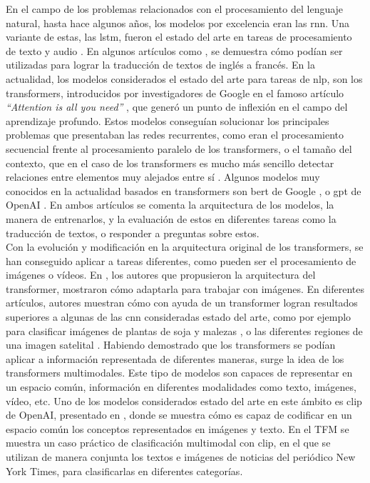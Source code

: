 	En el campo de los problemas relacionados con el procesamiento del lenguaje natural, hasta hace algunos años, los modelos por excelencia eran las \gls{rnn}. Una variante de estas, las \gls{lstm}, fueron el estado del arte en tareas de procesamiento de texto y audio \cite{ea_lstm}. En algunos artículos como \cite{ea_seq}, se demuestra cómo podían ser utilizadas para lograr la traducción de textos de inglés a francés. En la actualidad, los modelos considerados el estado del arte para tareas de \gls{nlp}, son los transformers, introducidos por investigadores de Google en el famoso artículo \textit{``Attention is all you need''} \cite{attention}, que generó un punto de inflexión en el campo del aprendizaje profundo. Estos modelos conseguían solucionar los principales problemas que presentaban las redes recurrentes, como eran el procesamiento secuencial frente al procesamiento paralelo de los transformers, o el tamaño del contexto, que en el caso de los transformers es mucho más sencillo detectar relaciones entre elementos muy alejados entre sí \cite{ea_rnn_transf}. Algunos modelos muy conocidos en la actualidad basados en transformers son \gls{bert} de Google \cite{ea_bert}, o \gls{gpt} de OpenAI \cite{ea_gpt}. En ambos artículos se comenta la arquitectura de los modelos, la manera de entrenarlos, y la evaluación de estos en diferentes tareas como la traducción de textos, o responder a preguntas sobre estos.\\ 
	
	Con la evolución y modificación en la arquitectura original de los transformers, se han conseguido aplicar a tareas diferentes, como pueden ser el procesamiento de imágenes o vídeos. En \cite{vit}, los autores que propusieron la arquitectura del transformer, mostraron cómo adaptarla para trabajar con imágenes. En diferentes artículos, autores muestran cómo con ayuda de un transformer logran resultados superiores a algunas de las \gls{cnn} consideradas estado del arte, como por ejemplo para clasificar imágenes de plantas de soja y malezas \cite{ea_vit}, o las diferentes regiones de una imagen satelital \cite{ea_vit2}. Habiendo demostrado que los transformers se podían aplicar a información representada de diferentes maneras, surge la idea de los transformers multimodales. Este tipo de modelos son capaces de representar en un espacio común, información en diferentes modalidades como texto, imágenes, vídeo, etc. Uno de los modelos considerados estado del arte en este ámbito es \gls{clip} de OpenAI, presentado en \cite{clip}, donde se muestra cómo es capaz de codificar en un espacio común los conceptos representados en imágenes y texto. En el TFM \cite{ea_multimodal} se muestra un caso práctico de clasificación multimodal con \gls{clip}, en el que se utilizan de manera conjunta los textos e imágenes de noticias del periódico New York Times, para clasificarlas en diferentes categorías. \\
	
